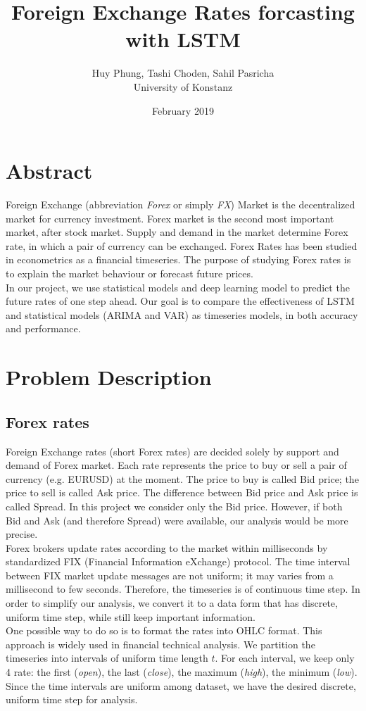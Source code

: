 \documentclass[11pt]{article}
\title{Foreign Exchange Rates forcasting with LSTM}
\author{Huy Phung, Tashi Choden, Sahil Pasricha
  \\University of Konstanz}
\date{February 2019}
\begin{document}
\maketitle
\pagebreak
\tableofcontents
\pagebreak

\section{Abstract}
Foreign Exchange (abbreviation \textit{Forex} or simply \textit{FX}) Market is
the decentralized market for currency investment. Forex market is the second
most important market, after stock market. Supply and demand in the market
determine Forex rate, in which a pair of currency can be exchanged. Forex Rates
has been studied in econometrics as a financial timeseries. The purpose of
studying Forex rates is to explain the market behaviour or forecast future
prices.\\
In our project, we use statistical models and deep learning model to predict the
future rates of one step ahead. Our goal is to compare the effectiveness of LSTM
and statistical models (ARIMA and VAR) as timeseries models, in both accuracy
and performance.


\section{Problem Description}
\subsection{Forex rates}
Foreign Exchange rates (short Forex rates) are decided solely by support and
demand of Forex market. Each rate represents the price to buy or sell a pair of
currency (e.g. EURUSD) at the moment. The price to buy is called Bid price; the
price to sell is called Ask price. The difference between Bid price and Ask
price is called Spread. In this project we consider only the Bid price. However,
if both Bid and Ask (and therefore Spread) were available, our analysis would be
more precise.\\
Forex brokers update rates according to the market
within milliseconds by standardized FIX (Financial Information eXchange)
protocol. The time interval between FIX market update messages are not
uniform; it may varies from a millisecond to few seconds. Therefore, the
timeseries is of continuous time step. In order to simplify our
analysis, we convert it to a data form that has discrete, uniform time
step, while still keep important information.\\
One possible way to do so is to format the rates into OHLC format. This approach
is widely used in financial technical analysis. We partition the timeseries into
intervals of uniform time length $t$. For each interval, we keep only 4 rate:
the first (\textit{open}), the last (\textit{close}), the maximum
(\textit{high}), the minimum (\textit{low}). Since the time intervals are
uniform among dataset, we have the desired discrete, uniform time step for
analysis.
\end{document}
